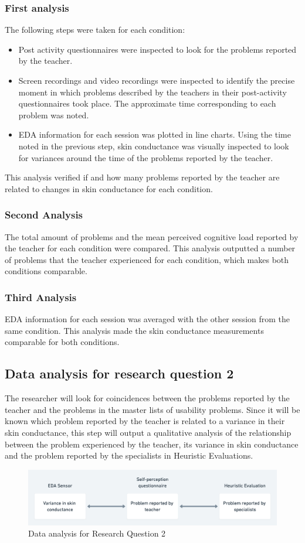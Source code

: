 \subsubsection{First analysis}
The following steps were taken for each condition:
\begin{itemize}
    \item Post activity questionnaires were inspected to look for the problems reported by the teacher.
    \item Screen recordings and video recordings were inspected to identify the precise moment in which problems described by the teachers in their post-activity questionnaires took place. The approximate time corresponding to each problem was noted.
    \item EDA information for each session was plotted in line charts. Using the time noted in the previous step, skin conductance was visually inspected to look for variances around the time of the problems reported by the teacher.
\end{itemize}
This analysis verified if and how many problems reported by the teacher are related to changes in skin conductance for each condition.
\subsubsection{Second Analysis}
The total amount of problems and the mean perceived cognitive load reported by the teacher for each condition were compared. This analysis outputted a number of problems that the teacher experienced for each condition, which makes both conditions comparable.
\subsubsection{Third Analysis}
EDA information for each session was averaged with the other session from the same condition. This analysis made the skin conductance measurements comparable for both conditions.
\subsection{Data analysis for research question 2}
The researcher will look for coincidences between the problems reported by the teacher and the problems in the master lists of usability problems. Since it will be known which problem reported by the teacher is related to a variance in their skin conductance, this step will output a qualitative analysis of the relationship between the problem experienced by the teacher, its variance in skin conductance and the problem reported by the specialists in Heuristic Evaluations.
\begin{figure}[!h]
    \includegraphics[clip,width=\columnwidth]{Figures/Heuristic-evaluation-diagram.png} 
\caption{Data analysis for Research Question 2} 
\label{fig:table}
\end{figure}
